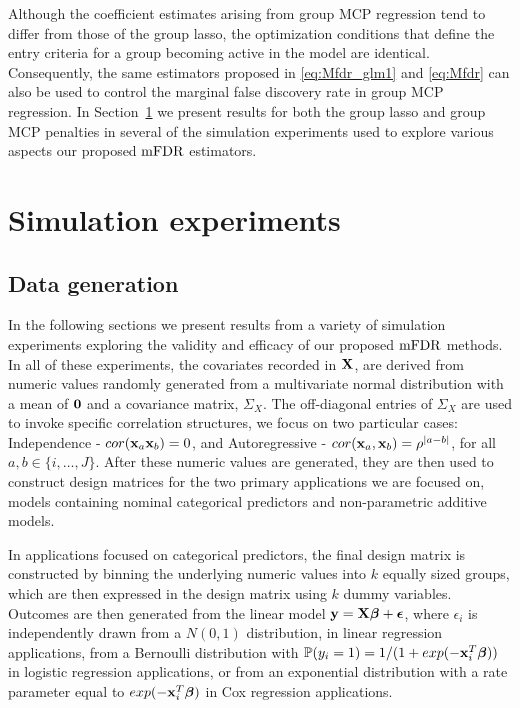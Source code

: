 Although the coefficient estimates arising from group MCP regression tend to differ from those of the group lasso, the optimization conditions that define the entry criteria for a group becoming active in the model are identical. Consequently, the same estimators proposed in \ref{eq:Mfdr_glm1} and \ref{eq:Mfdr} can also be used to control the marginal false discovery rate in group MCP regression. In Section~\ref{Sec:sim} we present results for both the group lasso and group MCP penalties in several of the simulation experiments used to explore various aspects our proposed $\textrm{mFDR}$ estimators.

\section{Simulation experiments}
\label{Sec:sim}

\subsection{Data generation}

In the following sections we present results from a variety of simulation experiments exploring the validity and efficacy of our proposed $\textrm{mFDR}$ methods.  In all of these experiments, the covariates recorded in $\mathbf{X}$, are derived from numeric values randomly generated from a multivariate normal distribution with a mean of $\mathbf{0}$ and a covariance matrix, $\Sigma_X$. The off-diagonal entries of $\Sigma_X$ are used to invoke specific correlation structures, we focus on two particular cases: Independence - $cor(\mathbf{x}_a \mathbf{x}_b) = 0$, and Autoregressive - $cor(\mathbf{x}_a, \mathbf{x}_b) = \rho^{|a - b|}$, for all $a, b \in \{i,\ldots,J\}$. After these numeric values are generated, they are then used to construct design matrices for the two primary applications we are focused on, models containing nominal categorical predictors and non-parametric additive models. 

In applications focused on categorical predictors, the final design matrix is constructed by binning the underlying numeric values into $k$ equally sized groups, which are then expressed in the design matrix using $k$ dummy variables. Outcomes are then generated from the linear model $\mathbf{y} = \mathbf{X} \boldsymbol{\beta}+ \boldsymbol{\epsilon}$, where $\epsilon_i$ is independently drawn from a $N(0,1)$ distribution, in linear regression applications, from a Bernoulli distribution with $\mathbb{P}(y_i = 1) = 1/(1 + exp(-\mathbf{x}_i^T\boldsymbol{\beta}))$ in logistic regression applications, or from an exponential distribution with a rate parameter equal to $exp(-\mathbf{x}_i^T\boldsymbol{\beta})$ in Cox regression applications.

